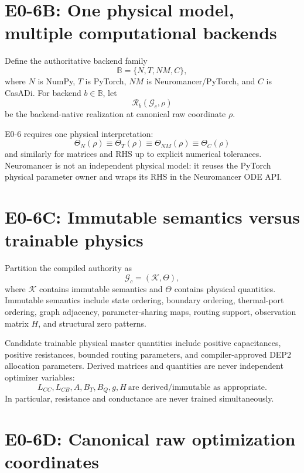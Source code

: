 \documentclass[11pt]{article}
\begin{document}
\section{E0-6B: One physical model, multiple computational backends}

Define the authoritative backend family
\[
\boxed{\mathbb B=\{N,T,NM,C\}},
\]
where $N$ is NumPy, $T$ is PyTorch, $NM$ is Neuromancer/PyTorch, and $C$ is
CasADi. For backend $b\in\mathbb B$, let
\[
\mathcal R_b(\mathcal G_c,\rho)
\]
be the backend-native realization at canonical raw coordinate $\rho$.

E0-6 requires one physical interpretation:
\[
\boxed{
\Theta_N(\rho)\equiv\Theta_T(\rho)\equiv
\Theta_{NM}(\rho)\equiv\Theta_C(\rho)
}
\]
and similarly for matrices and RHS up to explicit numerical tolerances.
Neuromancer is not an independent physical model: it reuses the PyTorch physical
parameter owner and wraps its RHS in the Neuromancer ODE API.

\section{E0-6C: Immutable semantics versus trainable physics}

Partition the compiled authority as
\[
\boxed{\mathcal G_c=(\mathcal K,\Theta)},
\]
where $\mathcal K$ contains immutable semantics and $\Theta$ contains physical
quantities. Immutable semantics include state ordering, boundary ordering,
thermal-port ordering, graph adjacency, parameter-sharing maps, routing support,
observation matrix $H$, and structural zero patterns.

Candidate trainable physical master quantities include positive capacitances,
positive resistances, bounded routing parameters, and compiler-approved DEP2
allocation parameters. Derived matrices and quantities are never independent
optimizer variables:
\[
\boxed{L_{CC},L_{CB},A,B_T,B_Q,g,H\ \text{are derived/immutable as appropriate}.}
\]
In particular, resistance and conductance are never trained simultaneously.

\section{E0-6D: Canonical raw optimization coordinates}
\end{document}
